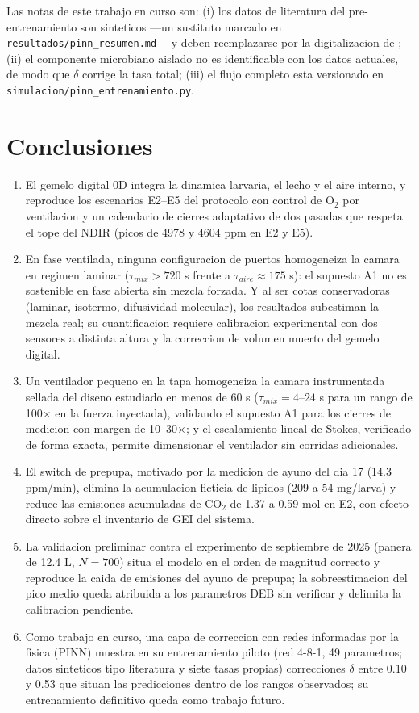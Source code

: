 Las notas de este trabajo en curso son: (i) los datos de literatura del
pre-entrenamiento son sinteticos ---un sustituto marcado en
\texttt{resultados/pinn\_resumen.md}--- y deben reemplazarse por la
digitalizacion de \textcite{eriksenDynamicModellingFeed2022,
eriksenMetabolicPerformanceFeed2024}; (ii) el componente microbiano
aislado no es identificable con los datos actuales, de modo que $\delta$
corrige la tasa total; (iii) el flujo completo esta versionado en
\texttt{simulacion/pinn\_entrenamiento.py}.

\section{Conclusiones}
\begin{enumerate}
  \item El gemelo digital 0D integra la dinamica larvaria, el lecho y el
  aire interno, y reproduce los escenarios E2--E5 del protocolo con control
  de O$_2$ por ventilacion y un calendario de cierres adaptativo de dos
  pasadas que respeta el tope del NDIR (picos de 4978 y 4604 ppm en E2 y
  E5).
  \item En fase ventilada, ninguna configuracion de puertos homogeneiza la
  camara en regimen laminar ($\tau_{mix} > 720$ s frente a $\tau_{aire} \approx 175$ s): el
  supuesto A1 no es sostenible en fase abierta sin mezcla forzada. Y al ser cotas
  conservadoras (laminar, isotermo, difusividad molecular), los resultados
  subestiman la mezcla real; su cuantificacion requiere calibracion
  experimental con dos sensores a distinta altura y la correccion de volumen
  muerto del gemelo digital.
  \item Un ventilador pequeno en la tapa homogeneiza la camara
  instrumentada sellada del diseno estudiado en menos de 60 s ($\tau_{mix} = 4$--$24$ s para un rango de 100$\times$ en la
  fuerza inyectada), validando el supuesto A1 para los cierres de medicion con
  margen de 10--30$\times$; y el escalamiento lineal de Stokes, verificado de
  forma exacta, permite dimensionar el ventilador sin corridas adicionales.
  \item El switch de prepupa, motivado por la medicion de ayuno del dia 17
  (14.3 ppm/min), elimina la acumulacion ficticia de lipidos (209 a
  54 mg/larva) y reduce las emisiones acumuladas de CO$_2$ de 1.37 a
  0.59 mol en E2, con efecto directo sobre el inventario de GEI del
  sistema.
  \item La validacion preliminar contra el experimento de septiembre de
  2025 (panera de 12.4 L, $N = 700$) situa el modelo en el orden de
  magnitud correcto y reproduce la caida de emisiones del ayuno de
  prepupa; la sobreestimacion del pico medio queda atribuida a los
  parametros DEB sin verificar y delimita la calibracion pendiente.
  \item Como trabajo en curso, una capa de correccion con redes
  informadas por la fisica (PINN) muestra en su entrenamiento
  piloto (red 4-8-1, 49 parametros; datos sinteticos tipo
  literatura y siete tasas propias) correcciones $\delta$ entre
  0.10 y 0.53 que situan las predicciones dentro de los rangos
  observados; su entrenamiento definitivo queda como trabajo futuro.
\end{enumerate}

